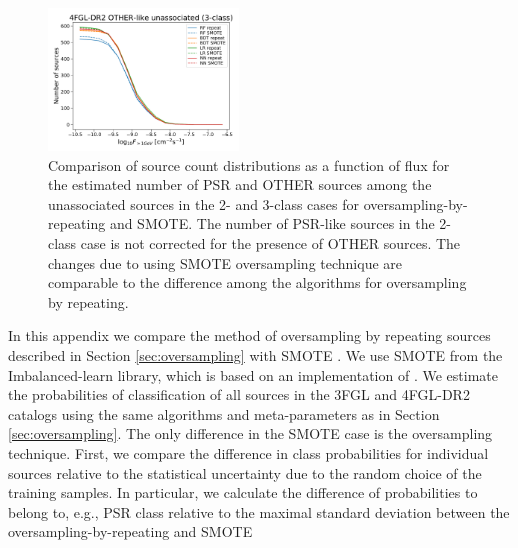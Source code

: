 \documentclass{aa}
\begin{document}
\begin{appendix}
\begin{figure}[h]
\includegraphics[width=0.45\textwidth]{plots/oversample/N_logS_4FGL-DR2_OTHER_3classes_O_vs_S.pdf}
\caption{Comparison of source count distributions as a function of flux for the estimated number of PSR and OTHER sources
among the unassociated sources in the 2- and 3-class cases for oversampling-by-repeating and SMOTE.
The number of PSR-like sources in the 2-class case is not corrected for the presence of OTHER sources.
The changes due to using SMOTE oversampling technique are comparable to the difference among the algorithms
for oversampling by repeating.
}
\label{fig:S_vs_O_NlogS}
\end{figure}

In this appendix we compare the method of oversampling by repeating sources described in Section \ref{sec:oversampling} 
with SMOTE \citep{Chawla_2002}. We use SMOTE from the Imbalanced-learn library, which is based on an implementation of \citet{Chawla_2002}. 
We estimate the probabilities of classification of all sources in the 3FGL and 4FGL-DR2 catalogs using the same algorithms and meta-parameters as in Section \ref{sec:oversampling}.
The only difference in the SMOTE case is the oversampling technique.
First, we compare the difference in class probabilities for individual sources relative to the statistical uncertainty due to the random choice of the training samples.
In particular, we calculate the difference of probabilities to belong to, e.g., PSR class relative to the maximal standard deviation
between the oversampling-by-repeating and SMOTE


\end{appendix}
\end{document}
